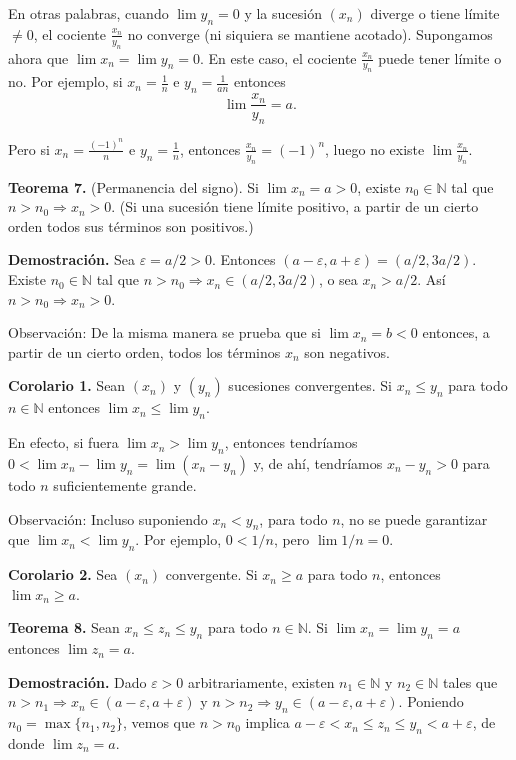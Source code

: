 \documentclass[12pt,oneside]{book}
\begin{document}
En otras palabras, cuando \( \lim y_n = 0 \) y la sucesión \( (x_n) \) diverge o tiene límite \( \neq 0 \), el cociente \( \frac{x_n}{y_n} \) no converge (ni siquiera se mantiene acotado). Supongamos ahora que \( \lim x_n = \lim y_n = 0 \). En este caso, el cociente \( \frac{x_n}{y_n} \) puede tener límite o no. Por ejemplo, si \( x_n = \frac{1}{n} \) e \( y_n = \frac{1}{an} \) entonces
\[\lim \frac{x_n}{y_n} = a.\]

Pero si \( x_n = \frac{(-1)^n}{n} \) e \( y_n = \frac{1}{n} \), entonces \( \frac{x_n}{y_n} = (-1)^n \), luego no existe \( \lim \frac{x_n}{y_n} \).

\textbf{Teorema 7.} (Permanencia del signo). Si \( \lim x_n = a > 0 \), existe \( n_0 \in \mathbb{N} \) tal que \( n > n_0 \Rightarrow x_n > 0 \). (Si una sucesión tiene límite positivo, a partir de un cierto orden todos sus términos son positivos.)

\textbf{Demostración.} Sea \( \varepsilon = a/2 > 0 \). Entonces \( (a - \varepsilon, a + \varepsilon) = (a/2, 3a/2) \). Existe \( n_0 \in \mathbb{N} \) tal que \( n > n_0 \Rightarrow x_n \in (a/2, 3a/2) \), o sea \( x_n > a/2 \). Así \( n > n_0 \Rightarrow x_n > 0 \).

Observación: De la misma manera se prueba que si \( \lim x_n = b < 0 \) entonces, a partir de un cierto orden, todos los términos \( x_n \) son negativos.

\textbf{Corolario 1.} Sean \( (x_n) \) y \( (y_n) \) sucesiones convergentes. Si \( x_n \leq y_n \) para todo \( n \in \mathbb{N} \) entonces \( \lim x_n \leq \lim y_n \).

En efecto, si fuera \(\lim x_n > \lim y_n\), entonces tendríamos \(0 < \lim x_n - \lim y_n = \lim (x_n - y_n)\) y, de ahí, tendríamos \(x_n - y_n > 0\) para todo \(n\) suficientemente grande.

Observación: Incluso suponiendo \(x_n < y_n\), para todo \(n\), no se puede garantizar que \(\lim x_n < \lim y_n\). Por ejemplo, \(0 < 1/n\), pero \(\lim 1/n = 0\).

\textbf{Corolario 2.} Sea \((x_n)\) convergente. Si \(x_n \ge a\) para todo \(n\), entonces \(\lim x_n \ge a\).

\textbf{Teorema 8.} Sean \(x_n \le z_n \le y_n\) para todo \(n \in \mathbb{N}\). Si \(\lim x_n = \lim y_n = a\) entonces \(\lim z_n = a\).

\textbf{Demostración.} Dado \(\varepsilon > 0\) arbitrariamente, existen \(n_1 \in \mathbb{N}\) y \(n_2 \in \mathbb{N}\) tales que \(n > n_1 \Rightarrow x_n \in (a - \varepsilon, a + \varepsilon)\) y \(n > n_2 \Rightarrow y_n \in (a - \varepsilon, a + \varepsilon)\). Poniendo \(n_0 = \max\{n_1, n_2\}\), vemos que \(n > n_0\) implica \(a - \varepsilon < x_n \le z_n \le y_n < a + \varepsilon\), de donde \(\lim z_n = a\).
\end{document}
